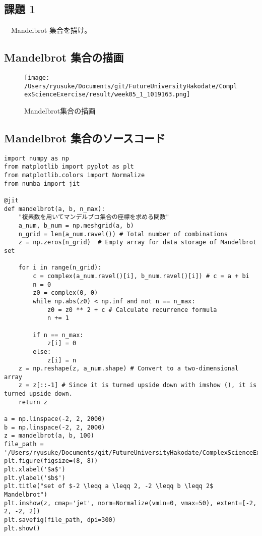 \documentclass[a4j]{jsarticle}
\begin{document}
\subsection{課題 1}
　Mandelbrot 集合を描け。\\

\subsection{Mandelbrot 集合の描画}
\begin{figure}[htbp]
\begin{center}
\texttt{[image: /Users/ryusuke/Documents/git/FutureUniversityHakodate/ComplexScienceExercise/result/week05\_1\_1019163.png]}
\caption{Mandelbrot集合の描画}
\end{center}
\end{figure}

\newpage

\subsection{Mandelbrot 集合のソースコード}

\begin{lstlisting}[caption=Pythonによるマンデルブロ集合の描画]
import numpy as np
from matplotlib import pyplot as plt
from matplotlib.colors import Normalize
from numba import jit

@jit
def mandelbrot(a, b, n_max):
    "複素数を用いてマンデルブロ集合の座標を求める関数"
    a_num, b_num = np.meshgrid(a, b)
    n_grid = len(a_num.ravel()) # Total number of combinations
    z = np.zeros(n_grid)  # Empty array for data storage of Mandelbrot set

    for i in range(n_grid):
        c = complex(a_num.ravel()[i], b_num.ravel()[i]) # c = a + bi
        n = 0
        z0 = complex(0, 0)
        while np.abs(z0) < np.inf and not n == n_max:
            z0 = z0 ** 2 + c # Calculate recurrence formula
            n += 1

        if n == n_max:
            z[i] = 0
        else:
            z[i] = n
    z = np.reshape(z, a_num.shape) # Convert to a two-dimensional array
    z = z[::-1] # Since it is turned upside down with imshow (), it is turned upside down.
    return z

a = np.linspace(-2, 2, 2000)
b = np.linspace(-2, 2, 2000)
z = mandelbrot(a, b, 100)
file_path = '/Users/ryusuke/Documents/git/FutureUniversityHakodate/ComplexScienceExercise/result/week05_1_1019163'
plt.figure(figsize=(8, 8))
plt.xlabel('$a$')
plt.ylabel('$b$')
plt.title("set of $-2 \leqq a \leqq 2, -2 \leqq b \leqq 2$ Mandelbrot")
plt.imshow(z, cmap='jet', norm=Normalize(vmin=0, vmax=50), extent=[-2, 2, -2, 2])
plt.savefig(file_path, dpi=300)
plt.show()
\end{lstlisting}
\end{document}

